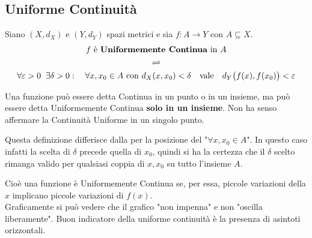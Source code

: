 \subsection{Uniforme Continuità}
\begin{definition}
	\label{def:funz_unif_cont}
	Siano $(X,d_X)$ e $(Y,d_Y)$ spazi metrici e sia $f:A \to Y$ con $A \subseteq X$.
	\begin{gather*}
		f \text{ è \textbf{Uniformemente Continua} in } A\\
		\rightleftharpoons\\
		\forall \varepsilon > 0 \;\; \exists \delta > 0: \quad \forall x,x_0 \in A \text{ con } d_X(x,x_0) < \delta \quad \text{vale} \quad d_Y\bigl(f(x),f(x_0)\bigr) < \varepsilon
	\end{gather*}
	\vspace*{-\baselineskip}
	\begin{note}
		Una funzione può essere detta Continua in un punto o in un insieme, ma può essere detta Uniformemente Continua \textbf{solo in un insieme}. Non ha senso affermare la Continuità Uniforme in un singolo punto.
	\end{note}
	\begin{note}
		Questa definizione differisce dalla  per la posizione del "$\forall x,x_0 \in A$". In questo caso infatti la scelta di $\delta$ precede quella di $x_0$, quindi si ha la certezza che il $\delta$ scelto rimanga valido per qualsiasi coppia di $x, x_0$ su tutto l'insieme $A$.
	\end{note}
	Cioè una funzione è Uniformemente Continua se, per essa, piccole variazioni della $x$ implicano piccole variazioni di $f(x)$.\\
	Graficamente si può vedere che il grafico "non impenna" e non "oscilla liberamente". Buon indicatore della uniforme continuità è la presenza di asintoti orizzontali.
\end{definition}
